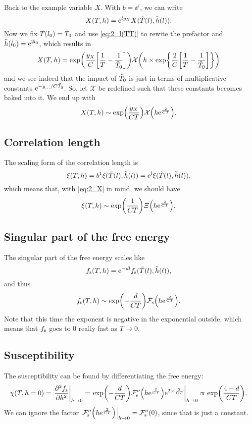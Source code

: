 \documentclass[11pt,letter, swedish, english
]{article}
\begin{document}
Back to the example variable $X$. With $b=\ee^l$, we can write
\begin{equation}
X(T, h) = \mathrm{e}^{ly_X} X(\tilde{T}(l), \tilde{h}(l)).
\end{equation}
Now we fix $\tilde{T}(l_0)=\tilde{T}_0$ and use \eqref{eq:2_l(TT)} to rewite the
prefactor and $\tilde{h}(l_0) = \mathrm{e}^{2l_0}$, which results in
\begin{equation}
X(T, h) = \exp(\frac{y_X}{C}\qty[\frac{1}{T}-\frac{1}{\tilde{T}_0}])
\mathcal{X}\qty(h\times\exp{\frac{2}{C}\qty[\frac{1}{T}-\frac{1}{\tilde{T}_0}]})
\end{equation}
and we see indeed that the impact of $\tilde{T}_0$ is just in terms of
multiplicative constants $\mathrm{e}^{-y_{...}/C\tilde{T}_0}$. So, let
$\mathcal{X}$ be redefined such that these constants becomes baked
into it. We end up with
\begin{equation}\label{eq:2_X}
X(T, h) \sim \exp(\frac{y_X}{CT})
\mathcal{X}\qty(h\mathrm{e}^{\frac{2}{CT}}).
\end{equation}


\subsection{Correlation length}
The scaling form of the correlation length is
\begin{equation}
\xi(T, h) = b^1 \xi(\tilde{T}(l), \tilde{h}(l))= \mathrm{e}^l \xi(\tilde{T}(l), \tilde{h}(l)),
\end{equation}
which means that, with \eqref{eq:2_X} in mind, we should have
\begin{equation}
\xi(T, h)  \sim \exp(\frac{1}{CT})
\varXi\qty(h\mathrm{e}^{\frac{2}{CT}}).
\end{equation}

\subsection{Singular part of the free energy}
The singular part of the free energy scales like
\begin{equation}
f_{\text{s}}(T, h) = \mathrm{e}^{-dl}f_{\text{s}}(\tilde{T}(l), \tilde{h}(l)),
\end{equation}
and thus
\begin{equation}
f_{\text{s}}(T, h) \sim \exp(-\frac{d}{CT})
\mathcal{F}_\text{s}\qty(h\mathrm{e}^{\frac{2}{CT}}).
\end{equation}
Note that this time the exponent is negative in the exponential
outside, which means that $f_{\text{s}}$ goes to 0 really fast as $T\to0$. 

\subsection{Susceptibility}
The susceptibility can be found by differentiating the free energy:
\begin{equation}
\chi(T, h=0) = \eval{\pdv[2]{\fs}{h}}_{h\to0}
=\eval{\exp(-\frac{d}{CT})
\mathcal{F}_\text{s}''\qty(h\ee^{\frac{2}{CT}})\ee^{2\times\frac{2}{CT}}
}_{h\to0}
\propto \exp(\frac{4-d}{CT}).
\end{equation}
We can ignore the factor 
$\eval{\mathcal{F}_\text{s}''\qty(h\ee^{\frac{2}{CT}})}_{h\to0} 
= \mathcal{F}_\text{s}''(0)$, since that is just a constant. 
\end{document}
